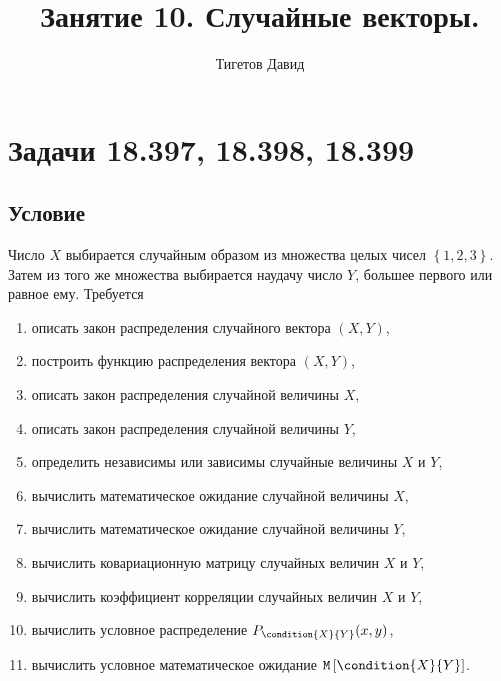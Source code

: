 \documentclass[12pt,a4paper]{article}
\begin{document}
    \title{Занятие 10. Случайные векторы.}
    \author{Тигетов Давид}
    \maketitle


    \section{Задачи 18.397, 18.398, 18.399}
    \subsection*{Условие}
    Число $X$ выбирается случайным образом из множества целых чисел $\left \{ 1, 2, 3 \right \}$. Затем из того же множества выбирается наудачу число $Y$, большее первого
    или равное ему. Требуется
    \begin{enumerate}
        \item описать закон распределения случайного вектора $\left ( X, Y \right )$,
        \item построить функцию распределения вектора $(X, Y)$,
        \item описать закон распределения случайной величины $X$,
        \item описать закон распределения случайной величины $Y$,
        \item определить независимы или зависимы случайные величины $X$ и $Y$,
        \item вычислить математическое ожидание случайной величины $X$,
        \item вычислить математическое ожидание случайной величины $Y$,
        \item вычислить ковариационную матрицу случайных величин $X$ и $Y$,
        \item вычислить коэффициент корреляции случайных величин $X$ и $Y$,
        \item вычислить условное распределение $P_{\condition{X}{Y}}(x,y)$,
        \item вычислить условное математическое ожидание $\expectation{\condition{X}{Y}}$.
    \end{enumerate}
\end{document}
